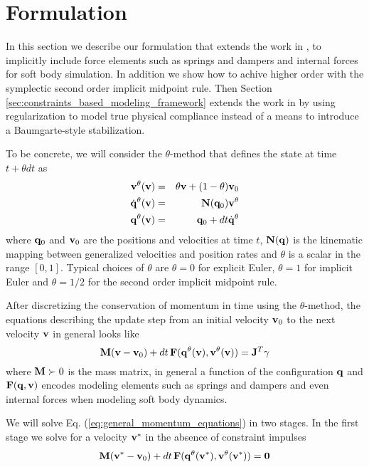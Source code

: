 \section{Formulation}

In this section we describe our formulation that extends the work in
\cite{bib:anitescu2010}, \cite{bib:todorov2014} to implicitly include force
elements such as springs and dampers and internal forces for soft body
simulation. In addition we show how to achive higher order with the symplectic
second order implicit midpoint rule. Then Section
\ref{sec:constraints_based_modeling_framework} extends the work in
\cite{bib:todorov2014} by using regularization to model true physical compliance
instead of a means to introduce a Baumgarte-style stabilization.

To be concrete, we will consider the $\theta\text{-method}$ that defines the
state at time $t+\theta dt$ as
\begin{eqnarray}
	{\mathbf{v}}^\theta({\mathbf{v}}) &=& \theta{\mathbf{v}}+(1-\theta){\mathbf{v}}_0\\
	\dot{{\mathbf{q}}}^\theta({\mathbf{v}}) &=& {\mathbf{N}}({\mathbf{q}}_0){\mathbf{v}}^\theta\\
	{\mathbf{q}}^\theta({\mathbf{v}}) &=& {\mathbf{q}}_0 + dt\dot{{\mathbf{q}}}^\theta
\end{eqnarray}
where ${\mathbf{q}}_0$ and ${\mathbf{v}}_0$ are the positions and velocities at time $t$,
${\mathbf{N}}({\mathbf{q}})$ is the kinematic mapping between generalized velocities and
position rates and $\theta$ is a scalar in the range $[0, 1]$. Typical choices
of $\theta$ are $\theta = 0$ for explicit Euler, $\theta=1$ for implicit Euler
and $\theta=1/2$ for the second order implicit midpoint rule.

After discretizing the conservation of momentum in time using the
$\theta\text{-method}$, the equations describing the update step from an initial
velocity ${\mathbf{v}}_0$ to the next velocity ${\mathbf{v}}$ in general looks like
\begin{equation}
	\mf{M}(\mf{v}-\mf{v}_0) + dt\,\mf{F}(\mf{q}^\theta(\mf{v}), \mf{v}^\theta(\mf{v})) = \mf{J}^T\mf{\gamma}
	\label{eq:general_momentum_equations}
\end{equation}
where ${\mathbf{M}}\succ 0$ is the mass matrix, in general a function of the
configuration ${\mathbf{q}}$ and ${\mathbf{F}}({\mathbf{q}}, {\mathbf{v}})$ encodes modeling elements
such as springs and dampers and even internal forces when modeling soft body
dynamics.

We will solve Eq. (\ref{eq:general_momentum_equations}) in two stages. In the
first stage we solve for a velocity ${\mathbf{v}}^*$ in the absence of constraint
impulses 
\begin{equation}
	\mf{M}(\mf{v}^*-\mf{v}_0) + dt\,\mf{F}(\mf{q}^\theta(\mf{v}^*), \mf{v}^\theta(\mf{v}^*)) = \mf{0}
	\label{eq:vstar_definition}
\end{equation}

